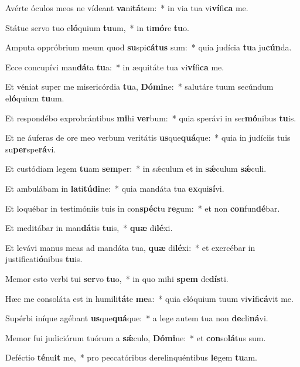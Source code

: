 \item Avérte óculos meos ne vídeant \textbf{va}ni\textbf{tá}tem:~* in via tua vi\textbf{ví}fi\textbf{ca} me.
\item Státue servo tuo e\textbf{ló}quium \textbf{tu}um,~* in ti\textbf{mó}re \textbf{tu}o.
\item Amputa oppróbrium meum quod \textbf{su}spi\textbf{cá}\textbf{tus} sum:~* quia judícia \textbf{tu}a ju\textbf{cún}da.
\item Ecce concupívi man\textbf{dá}ta \textbf{tu}a:~* in æquitáte tua vi\textbf{ví}fi\textbf{ca} me.
\item Et véniat super me misericórdia \textbf{tu}a, \textbf{Dó}\textbf{mi}ne:~* salutáre tuum secúndum e\textbf{ló}quium \textbf{tu}um.
\item Et respondébo exprobrántibus \textbf{mi}hi \textbf{ver}bum:~* quia sperávi in ser\textbf{mó}nibus \textbf{tu}is.
\item Et ne áuferas de ore meo verbum veritátis \textbf{us}que\textbf{quá}que:~* quia in judíciis tuis su\textbf{per}spe\textbf{rá}vi.
\item Et custódiam legem \textbf{tu}am \textbf{sem}per:~* in sǽculum et in \textbf{sǽ}culum \textbf{sǽ}culi.
\item Et ambulábam in \textbf{la}ti\textbf{tú}\textbf{di}ne:~* quia mandáta tua \textbf{ex}qui\textbf{sí}vi.
\item Et loquébar in testimóniis tuis in con\textbf{spéc}tu \textbf{re}gum:~* et non \textbf{con}fun\textbf{dé}bar.
\item Et meditábar in man\textbf{dá}tis \textbf{tu}is,~* \textbf{quæ} di\textbf{lé}xi.
\item Et levávi manus meas ad mandáta tua, \textbf{quæ} di\textbf{lé}xi:~* et exercébar in justificati\textbf{ó}nibus \textbf{tu}is.
\item Memor esto verbi tui \textbf{ser}vo \textbf{tu}o,~* in quo mihi \textbf{spem} de\textbf{dís}ti.
\item Hæc me consoláta est in humili\textbf{tá}te \textbf{me}a:~* quia elóquium tuum vi\textbf{vi}fi\textbf{cá}vit me.
\item Supérbi iníque agébant \textbf{us}que\textbf{quá}que:~* a lege autem tua non \textbf{de}cli\textbf{ná}vi.
\item Memor fui judiciórum tuórum a \textbf{sǽ}culo, \textbf{Dó}\textbf{mi}ne:~* et \textbf{con}so\textbf{lá}tus sum.
\item Deféctio \textbf{té}nu\textbf{it} me,~* pro peccatóribus derelinquéntibus \textbf{le}gem \textbf{tu}am.
